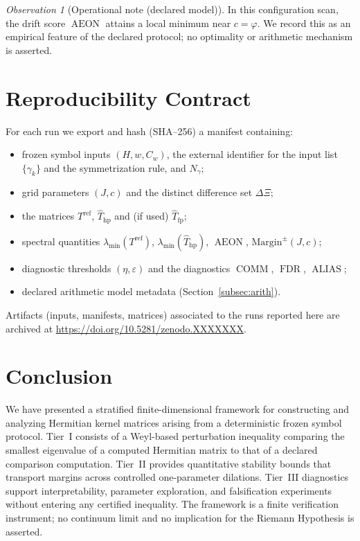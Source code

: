 \documentclass[12pt,reqno]{amsart}
\numberwithin{equation}{section}
\theoremstyle{definition}
\theoremstyle{remark}
\newtheorem{observation}[theorem]{Observation}
\newcommand{\golden}{\varphi}
\DeclareMathOperator{\AEON}{AEON}
\DeclareMathOperator{\COMM}{COMM}
\DeclareMathOperator{\FDR}{FDR}
\DeclareMathOperator{\ALIAS}{ALIAS}
\newcommand{\ArtifactAccess}{\url{https://doi.org/10.5281/zenodo.XXXXXXX}}
\begin{document}
\begin{observation}[Operational note (declared model)]
\label{obs:golden}
In this configuration scan, the drift score $\AEON$ attains a local minimum near
$c=\golden$. We record this as an empirical feature of the declared protocol; no
optimality or arithmetic mechanism is asserted.
\end{observation}

\section{Reproducibility Contract}
\label{sec:repro}

For each run we export and hash (SHA--256) a manifest containing:
\begin{itemize}
\item frozen symbol inputs $(H,w,C_w)$, the external identifier for the input list
$\{\gamma_k\}$ and the symmetrization rule, and $N_\gamma$;
\item grid parameters $(J,c)$ and the distinct difference set $\Delta\Xi$;
\item the matrices $T^{\mathrm{ref}}$, $\widehat T_{\mathrm{hp}}$ and (if used)
$\widehat T_{\mathrm{fp}}$;
\item spectral quantities $\lambda_{\min}(T^{\mathrm{ref}})$,
$\lambda_{\min}(\widehat T_{\mathrm{hp}})$, $\AEON$, $\mathrm{Margin}^\pm(J,c)$;
\item diagnostic thresholds $(\eta,\varepsilon)$ and the diagnostics
$\COMM$, $\FDR$, $\ALIAS$;
\item declared arithmetic model metadata (Section~\ref{subsec:arith}).
\end{itemize}
Artifacts (inputs, manifests, matrices) associated to the runs reported here are archived at
\ArtifactAccess.

\section{Conclusion}
\label{sec:conclusion}

We have presented a stratified finite-dimensional framework for constructing and
analyzing Hermitian kernel matrices arising from a deterministic frozen symbol protocol.
Tier~I consists of a Weyl-based perturbation inequality comparing the smallest eigenvalue
of a computed Hermitian matrix to that of a declared comparison computation. Tier~II
provides quantitative stability bounds that transport margins across controlled
one-parameter dilations. Tier~III diagnostics support interpretability, parameter
exploration, and falsification experiments without entering any certified inequality.
The framework is a finite verification instrument; no continuum limit and no implication
for the Riemann Hypothesis is asserted.
\end{document}
